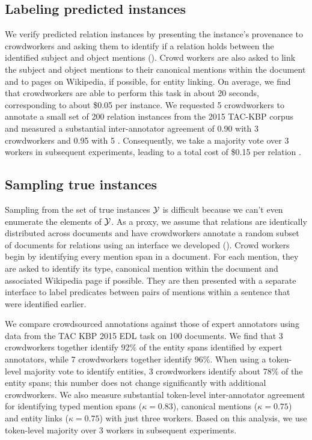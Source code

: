 \subsection{Labeling predicted instances}
We verify predicted relation instances by presenting the instance's provenance to crowdworkers
  and asking them to identify if a relation holds between the identified subject and object mentions (). 
  Crowd workers are also asked to link the subject and object mentions to their canonical mentions within the document and to pages on Wikipedia, if possible, for entity linking.
On average, we find that crowdworkers are able to perform this task in about 20 seconds, corresponding to about \$0.05 per instance.
We requested 5 crowdworkers to annotate a small set of 200 relation instances from the 2015 TAC-KBP corpus 
and measured a substantial inter-annotator agreement of 0.90 with 3 crowdworkers and 0.95 with 5 .
Consequently, we take a majority vote over 3 workers in subsequent experiments,
leading to a total cost of \$0.15 per relation .

\subsection{Sampling true instances}
Sampling from the set of true instances $\mathcal{Y}$ is difficult because we can't even enumerate the elements of $\mathcal{Y}$.
As a proxy, we assume that relations are identically distributed across documents and have crowdworkers annotate a random subset of documents for relations using an interface we developed ().
Crowd workers begin by identifying every mention span in a document.
  For each mention, they are asked to identify its type, canonical mention within the document
  and associated Wikipedia page if possible.
They are then presented with a separate interface to label predicates between pairs of mentions within a sentence that were identified earlier.

We compare crowdsourced annotations against those of expert annotators using data from the TAC KBP 2015 EDL task on 100 documents.
We find that 3 crowdworkers together identify 92\% of the entity spans identified by expert annotators, while 7 crowdworkers together identify 96\%.
When using a token-level majority vote to identify entities, 3 crowdworkers identify about 78\% of the entity spans; this number does not change significantly with additional crowdworkers.
We also measure substantial token-level inter-annotator agreement for identifying typed mention spans ($\kappa = 0.83$), canonical mentions ($\kappa = 0.75$) and entity links ($\kappa = 0.75$) with just three workers.
Based on this analysis, we use token-level majority over 3 workers in subsequent experiments.

